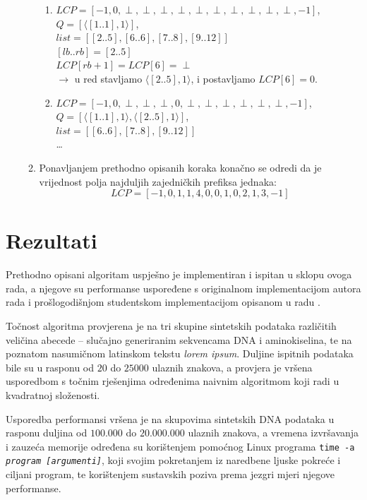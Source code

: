 \documentclass[a4paper,12pt]{article}
\begin{document}
\begin{enumerate}
\begin{enumerate}
\begin{enumerate}
				\item $LCP = [-1,0,\perp,\perp,\perp,\perp,\perp,\perp,\perp,\perp,\perp, \perp, -1]$,\\
			   	$Q = [\langle[1..1],1\rangle]$,\\
			    $list = [[2..5],[6..6],[7..8],[9..12]]$\\
			    
				$[lb .. rb] = [2..5]$\\

				$LCP[rb+1]=LCP[6]=\perp$\\
				$\rightarrow$ u red stavljamo $\langle[2..5],1\rangle$, i postavljamo $LCP[6]=0$.
				\newline
				\item $LCP = [-1,0,\perp,\perp,\perp,0,\perp,\perp,\perp,\perp,\perp, \perp, -1]$,\\
				$Q = [\langle[1..1],1\rangle, \langle[2..5],1\rangle]$,\\
			    $list = [[6..6],[7..8],[9..12]]$\\
				\ldots
			\end{enumerate}

      	\item Ponavljanjem prethodno opisanih koraka konačno se odredi da je vrijednost polja najduljih zajedničkih prefiksa jednaka: 
		$$ LCP = [-1,0,1,1,4,0,0,1,0,2,1,3,-1] $$
	\end{enumerate}
\end{enumerate}


\section{Rezultati}

Prethodno opisani algoritam uspješno je implementiran i ispitan u sklopu ovoga rada, a njegove su performanse uspoređene s originalnom implementacijom autora rada \cite{beller2013} i prošlogodišnjom studentskom implementacijom opisanom u radu \cite{studenti2017}.

Točnost algoritma provjerena je na tri skupine sintetskih podataka različitih veličina abecede -- slučajno generiranim sekvencama DNA i aminokiselina, te na poznatom nasumičnom latinskom tekstu \textit{lorem ipsum}. Duljine ispitnih podataka bile su u rasponu od $20$ do $25000$ ulaznih znakova, a provjera je vršena usporedbom s točnim rješenjima određenima naivnim algoritmom koji radi u kvadratnoj složenosti.

Usporedba performansi vršena je na skupovima sintetskih DNA podataka u rasponu duljina od $100.000$ do $20.000.000$ ulaznih znakova, a vremena izvršavanja i zauzeća memorije određena su korištenjem pomoćnog Linux programa \texttt{time -a \textit{program [argumenti]}}, koji svojim pokretanjem iz naredbene ljuske pokreće i ciljani program, te korištenjem sustavskih poziva prema jezgri mjeri njegove performanse.
\end{document}
